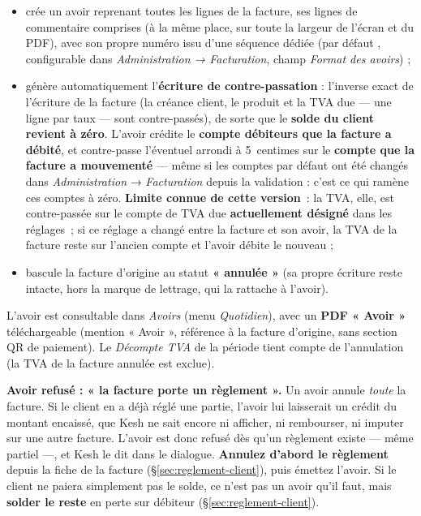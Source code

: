 \documentclass[a4paper,11pt,oneside]{article}
\begin{document}
\begin{itemize}
    \item crée un avoir reprenant toutes les lignes de la facture, ses lignes de commentaire comprises (à la même place, sur toute la largeur de l'écran et du PDF), avec son propre numéro issu d'une séquence dédiée (par défaut , configurable dans \emph{Administration → Facturation}, champ \emph{Format des avoirs}) ;
    \item génère automatiquement l'\textbf{écriture de contre-passation} : l'inverse exact de l'écriture de la facture (la créance client, le produit et la TVA due — une ligne par taux — sont contre-passés), de sorte que le \textbf{solde du client revient à zéro}. L'avoir crédite le \textbf{compte débiteurs que la facture a débité}, et contre-passe l'éventuel arrondi à 5~centimes sur le \textbf{compte que la facture a mouvementé} --- même si les comptes par défaut ont été changés dans \emph{Administration} → \emph{Facturation} depuis la validation : c'est ce qui ramène ces comptes à zéro. \textbf{Limite connue de cette version}~: la TVA, elle, est contre-passée sur le compte de TVA due \textbf{actuellement désigné} dans les réglages~; si ce réglage a changé entre la facture et son avoir, la TVA de la facture reste sur l'ancien compte et l'avoir débite le nouveau ;
    \item bascule la facture d'origine au statut \textbf{« annulée »} (sa propre écriture reste intacte, hors la marque de lettrage, qui la rattache à l'avoir).
\end{itemize}

L'avoir est consultable dans \emph{Avoirs} (menu \emph{Quotidien}), avec un \textbf{PDF « Avoir »} téléchargeable (mention « Avoir », référence à la facture d'origine, sans section QR de paiement). Le \emph{Décompte TVA} de la période tient compte de l'annulation (la TVA de la facture annulée est exclue).

\begin{keshwarning}
\textbf{Avoir refusé : « la facture porte un règlement ».} Un avoir annule \emph{toute} la facture. Si
le client en a déjà réglé une partie, l'avoir lui laisserait un crédit du montant encaissé, que
Kesh ne sait encore ni afficher, ni rembourser, ni imputer sur une autre facture. L'avoir est donc
refusé dès qu'un règlement existe --- même partiel ---, et Kesh le dit dans le dialogue.
\textbf{Annulez d'abord le règlement} depuis la fiche de la facture (\S\ref{sec:reglement-client}),
puis émettez l'avoir. Si le client ne paiera simplement pas le solde, ce n'est pas un avoir qu'il
faut, mais \textbf{solder le reste} en perte sur débiteur (\S\ref{sec:reglement-client}).
\end{keshwarning}
\end{document}

